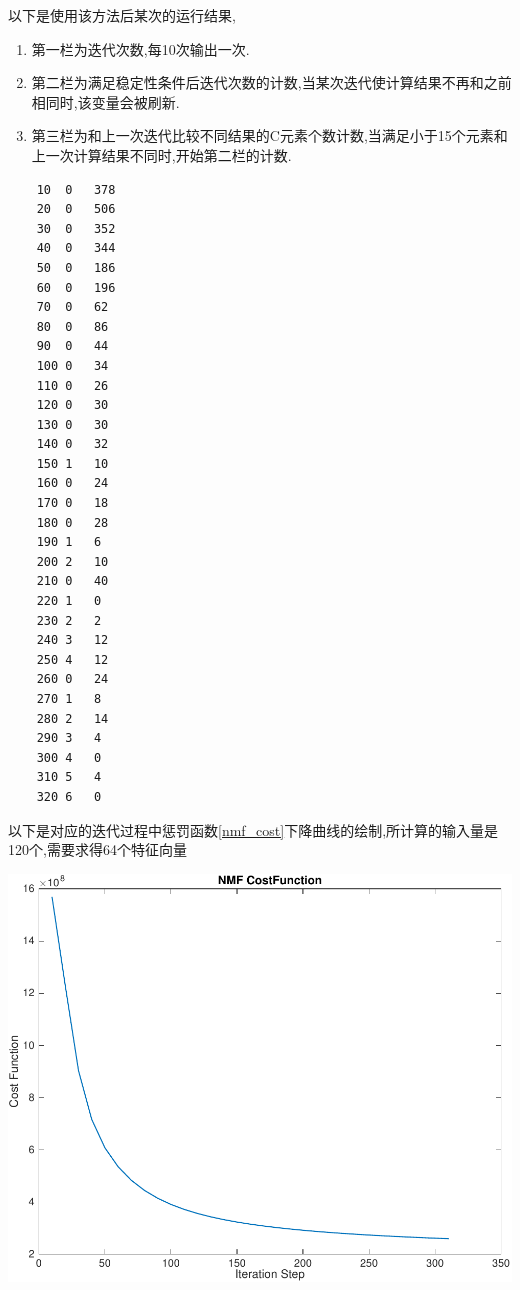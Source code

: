 以下是使用该方法后某次的运行结果,
\begin{enumerate}
	\item 第一栏为迭代次数,每10次输出一次.
	\item 第二栏为满足稳定性条件后迭代次数的计数,当某次迭代使计算结果不再和之前相同时,该变量会被刷新.
	\item 第三栏为和上一次迭代比较不同结果的C元素个数计数,当满足小于15个元素和上一次计算结果不同时,开始第二栏的计数.
\end{enumerate}

\begin{multicols}{4}
\begin{verbatim}
	10	0	378
	20	0	506
	30	0	352
	40	0	344
	50	0	186
	60	0	196
	70	0	62
	80	0	86
	90	0	44
	100	0	34
	110	0	26
	120	0	30
	130	0	30
	140	0	32
	150	1	10
	160	0	24
	170	0	18
	180	0	28
	190	1	6
	200	2	10
	210	0	40
	220	1	0
	230	2	2
	240	3	12
	250	4	12
	260	0	24
	270	1	8
	280	2	14
	290	3	4
	300	4	0
	310	5	4
	320	6	0
	\end{verbatim}
\end{multicols}
以下是对应的迭代过程中惩罚函数\ref{nmf_cost}下降曲线的绘制,所计算的输入量是120个,需要求得64个特征向量
\begin{center}
\begin{minipage}[t]{\linewidth}
\center
{
\includegraphics[width=\textwidth]{Img/nmf_cost.pdf} 
}
\end{minipage}
\medskip
\end{center}

